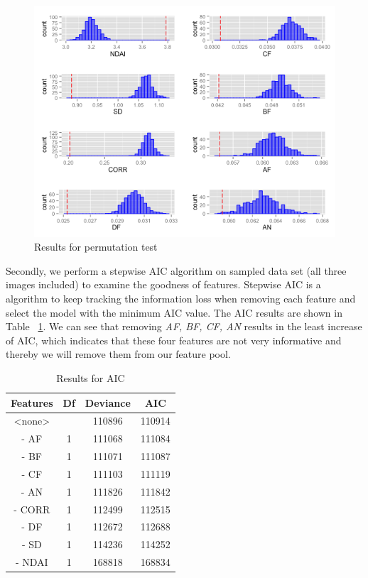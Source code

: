 \documentclass[english]{article}\usepackage{graphicx, color}
\numberwithin{equation}{section}
\numberwithin{figure}{section}
\begin{document}
\begin{figure}[!h]
  \begin{center}
    \includegraphics[width=\columnwidth]{figures/PermutationTest.png}
  \end{center}
  \caption{Results for permutation test}
  \label{fig:PT}
\end{figure}

Secondly, we perform a stepwise AIC algorithm on sampled data set (all three 
images included) to examine the goodness of features. Stepwise AIC is a 
algorithm to keep tracking the information loss when removing each feature 
and select the model with the minimum AIC value. The AIC results are shown 
in Table ~\ref{tab:PermTest}. We can see that removing \textit{AF, BF, CF, AN} 
results in the least increase of AIC, which indicates that these four features 
are not very informative and thereby we will remove them from our feature pool.
\begin{table}[!h]
\centering
\begin{tabular}{*{4}{c}}
Features & Df & Deviance & AIC\\
       \hline
<none>   &    & 110896   & 110914\\
- AF     & 1  & 111068   & 111084\\
- BF     & 1  & 111071   & 111087\\
- CF     & 1  & 111103   & 111119\\
- AN     & 1  & 111826   & 111842\\
- CORR   & 1  & 112499   & 112515\\
- DF     & 1  & 112672   & 112688\\
- SD     & 1  & 114236   & 114252\\
- NDAI   & 1  & 168818   & 168834\\
\end{tabular}
\caption{Results for AIC}
\label{tab:PermTest}
\end{table}
\end{document}
